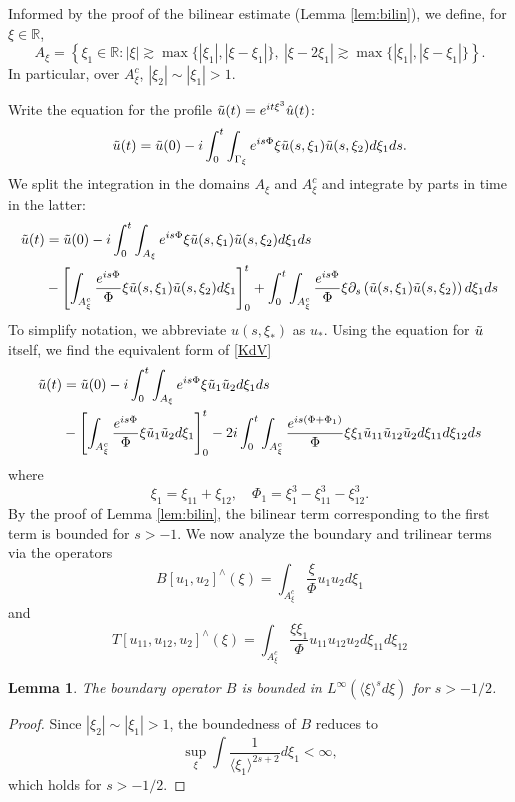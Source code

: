 \documentclass[a4paper, 11pt]{amsart}
\newcommand{\R}{\mathbb{R}}
\newcommand{\jap}[1]{\langle #1 \rangle}
\theoremstyle{plain}
\newtheorem{lem}[thm]{Lemma}
\theoremstyle{definition}
\theoremstyle{remark}
\newcommand{\5}{\text{V}}
\numberwithin{equation}{section}
\theoremstyle{mytheoremstyle} \newtheorem{nota}[thm]{Remark}
\theoremstyle{mytheoremstyle} \newtheorem{exemplo}[thm]{Example}
\newcommand{\blue}{\color{blue}}
\begin{document}
{
\blue


Informed by the proof of the bilinear estimate (Lemma \ref{lem:bilin}), we define, for $\xi\in \R$,
$$
A_\xi=\left\{\xi_1\in \R : |\xi|\gtrsim \max\{|\xi_1|, |\xi-\xi_1|\},\ |\xi-2\xi_1|\gtrsim \max\{|\xi_1|, |\xi-\xi_1|\} \right\}.
$$
In particular, over $A_\xi^c$, $|\xi_2|\sim |\xi_1|>1$.

Write the equation for the profile $\Tilde{u}(t)=e^{it\xi^3}\hat{u}(t)$:
$$
\Tilde{u}(t)=\Tilde{u}(0) - i\int_0^t \int_{\Gamma_\xi} e^{is\Phi}\xi \Tilde{u}(s,\xi_1)\Tilde{u}(s,\xi_2)d\xi_1 ds.
$$
We split the integration in the domains $A_\xi$ and $A^c_\xi$ and integrate by parts in time in the latter:
\begin{align*}
    \Tilde{u}(t)&=\Tilde{u}(0) - i \int_0^t \int_{A_\xi} e^{is\Phi}\xi \Tilde{u}(s,\xi_1)\Tilde{u}(s,\xi_2)d\xi_1 ds \\&- \left[\int_{A_\xi^c}\frac{e^{is\Phi}}{\Phi}\xi \Tilde{u}(s,\xi_1)\Tilde{u}(s,\xi_2)d\xi_1 \right]_0^t + \int_0^t \int_{A_\xi^c} \frac{e^{is\Phi}}{\Phi}\xi \partial_s\left(\Tilde{u}(s,\xi_1)\Tilde{u}(s,\xi_2)\right)d\xi_1 ds
\end{align*}
To simplify notation, we abbreviate $u(s,\xi_\ast)$ as $u_\ast$. Using the equation for $\Tilde{u}$ itself, we find the equivalent form of \eqref{KdV}
\begin{align*}
    \Tilde{u}(t)&=\Tilde{u}(0) - i \int_0^t \int_{A_\xi} e^{is\Phi}\xi \Tilde{u}_1\Tilde{u}_2d\xi_1 ds \\&- \left[\int_{A_\xi^c}\frac{e^{is\Phi}}{\Phi}\xi \Tilde{u}_1\Tilde{u}_2d\xi_1 \right]_0^t -2i \int_0^t \int_{A_\xi^c} \frac{e^{is(\Phi+\Phi_1)}}{\Phi}\xi\xi_1 \Tilde{u}_{11}\Tilde{u}_{12}\Tilde{u}_{2}d\xi_{11}d\xi_{12} ds
\end{align*}
where
$$
\xi_1=\xi_{11}+\xi_{12},\quad \Phi_1=\xi_1^3-\xi_{11}^3-\xi_{12}^3.
$$
By the proof of Lemma \ref{lem:bilin}, the bilinear term corresponding to the first term is bounded for $s>-1$. We now analyze the boundary and trilinear terms via the operators
\begin{equation}
    B[u_1,u_2]^\wedge(\xi)=\int_{A_\xi^c}\frac{\xi}{\Phi} u_1u_2d\xi_1
\end{equation}
and
\begin{equation}
    T[u_{11},u_{12},u_2]^\wedge(\xi)=\int_{A_\xi^c} \frac{\xi\xi_1}{\Phi}u_{11}u_{12}u_2d\xi_{11}d\xi_{12}
\end{equation}


\begin{lem}
   The boundary operator $B$ is bounded in $L^\infty(\jap{\xi}^sd\xi)$ for $s>-1/2$.
\end{lem}
\begin{proof}
    Since $|\xi_2|\sim |\xi_1|>1$, the boundedness of $B$ reduces to
    $$
    \sup_\xi\int \frac{1}{\jap{\xi_1}^{2s+2}}d\xi_1<\infty,
    $$
    which holds for $s>-1/2$.
\end{proof}

}
\end{document}
